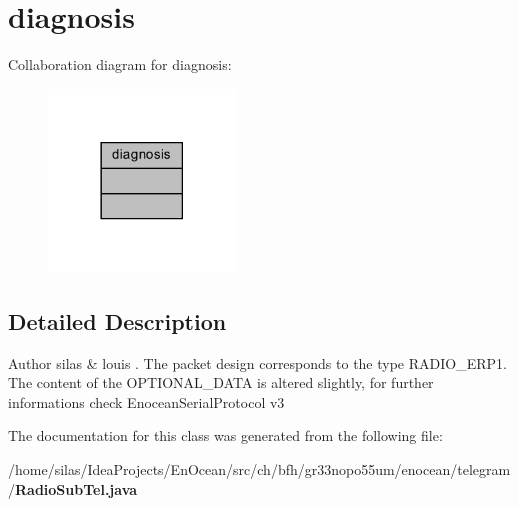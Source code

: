 \section{diagnosis}
\label{classdiagnosis}


Collaboration diagram for diagnosis\+:\nopagebreak
\begin{figure}[H]
\begin{center}
\leavevmode
\includegraphics[width=141pt]{de/dfe/classdiagnosis__coll__graph}
\end{center}
\end{figure}


\subsection{Detailed Description}
\begin{DoxyAuthor}{Author}
silas \& louis . The packet design corresponds to the type R\+A\+D\+I\+O\+\_\+\+E\+R\+P1. The content of the O\+P\+T\+I\+O\+N\+A\+L\+\_\+\+D\+A\+TA is altered slightly, for further informations check Enocean\+Serial\+Protocol v3 
\end{DoxyAuthor}


The documentation for this class was generated from the following file\+:\begin{DoxyCompactItemize}
\item 
/home/silas/\+Idea\+Projects/\+En\+Ocean/src/ch/bfh/gr33nopo55um/enocean/telegram/{\bf Radio\+Sub\+Tel.\+java}\end{DoxyCompactItemize}
